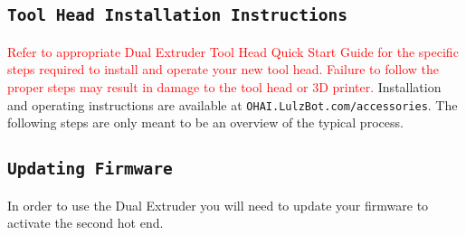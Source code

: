 \subsection{\texttt{Tool Head Installation Instructions}}
\textcolor{red}{Refer to appropriate Dual Extruder Tool Head Quick Start Guide for the specific steps required to install and operate your new tool head. Failure to follow the proper steps may result in damage to the tool head or 3D printer.} Installation and operating instructions are available at \texttt{OHAI.LulzBot.com/accessories}. The following steps are only meant to be an overview of the typical process.

\subsection{\texttt{Updating Firmware}}
In order to use the Dual Extruder you will need to update your firmware to activate the second hot end.

